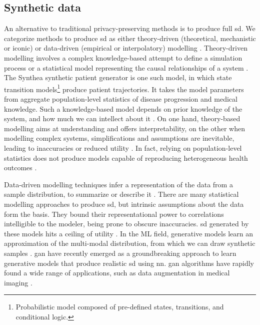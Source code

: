     \subsection{Synthetic data}
        An alternative to traditional privacy-preserving methods is to produce full \gls{sd}. We categorize methods to produce \gls{sd} as either theory-driven (theoretical, mechanistic or iconic) or data-driven (empirical or interpolatory) modelling \cite{Kim_2017, Hand2019}. Theory-driven modelling involves a complex knowledge-based attempt to define a simulation process or a statistical model representing the causal relationships of a system \cite{Yousefi2018-dy, Kansal2018-dx}. The Synthea \cite{Walonoski_2017} synthetic patient generator is one such model, in which state transition models\footnote{Probabilistic model composed of pre-defined states, transitions, and conditional logic.} produce patient trajectories. It takes the model parameters from aggregate population-level statistics of disease progression and medical knowledge. Such a knowledge-based model depends on prior knowledge of the system, and how much we can intellect about it \cite{Kim_2017, Bonnery2019-ug}. On one hand, theory-based modelling aims at understanding and offers interpretability, on the other when modelling complex systems, simplifications and assumptions are inevitable, leading to inaccuracies or reduced utility \cite{Hand2019, Rankin2020}. In fact, relying on population-level statistics does not produce models capable of reproducing heterogeneous health outcomes \cite{Chen_2019}.\par
        
        Data-driven modelling techniques infer a representation of the data from a sample distribution, to summarize or describe it \cite{Hand2019}. There are many statistical modelling approaches to produce \gls{sd}, but intrinsic assumptions about the data form the basis. They bound their representational power to correlations intelligible to the modeler, being prone to obscure inaccuracies. \gls{sd} generated by these models hits a ceiling of utility \cite{Rankin2020}. In the ML field, generative models learn an approximation of the multi-modal distribution, from which we can draw synthetic samples  \cite{goodgan}. \Gls{gan} \cite{goodgan} have recently emerged as a groundbreaking approach to learn generative models that produce realistic \gls{sd} using \gls{nn}. \gls{gan} algorithms have rapidly found a wide range of applications, such as data augmentation in medical imaging \cite{Yi2019, Wang2020, Zhou2020}.\par
        
